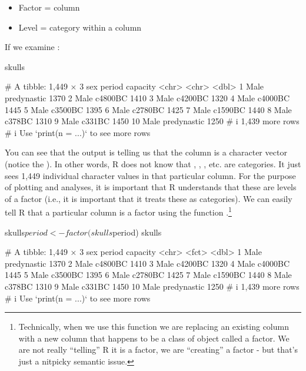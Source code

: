 {
\begin{itemize}
  \setlength\itemsep{-1em}
    \item Factor = column
    \item Level = category within a column
\end{itemize}
}

If we examine :

\begin{inR}
skulls
\end{inR}
\begin{outR}
# A tibble: 1,449 × 3
   sex   period      capacity
   <chr> <chr>          <dbl>
 1 Male  predynastic     1370
 2 Male  c4800BC         1410
 3 Male  c4200BC         1320
 4 Male  c4000BC         1445
 5 Male  c3500BC         1395
 6 Male  c2780BC         1425
 7 Male  c1590BC         1440
 8 Male  c378BC          1310
 9 Male  c331BC          1450
10 Male  predynastic     1250
# i 1,439 more rows
# i Use `print(n = ...)` to see more rows
\end{outR}

\noindent
You can see that the output is telling us that the  column is a character vector (notice the ). In other words, R does not know that , , , etc. are categories. It just sees 1,449 individual character values in that particular column. For the purpose of plotting and analyses, it is important that R understands that these are levels of a factor (i.e., it is important that it treats these as categories). We can easily tell R that a particular column is a factor using the function .\footnote{Technically, when we use this function we are replacing an existing column with a new column that happens to be a class of object called a factor. We are not really ``telling'' R it is a factor, we are ``creating'' a factor - but that's just a nitpicky semantic issue.}

\begin{inR}
skulls$period <- factor(skulls$period)
skulls
\end{inR}
\begin{outR}
# A tibble: 1,449 × 3
   sex   period      capacity
   <chr> <fct>          <dbl>
 1 Male  predynastic     1370
 2 Male  c4800BC         1410
 3 Male  c4200BC         1320
 4 Male  c4000BC         1445
 5 Male  c3500BC         1395
 6 Male  c2780BC         1425
 7 Male  c1590BC         1440
 8 Male  c378BC          1310
 9 Male  c331BC          1450
10 Male  predynastic     1250
# i 1,439 more rows
# i Use `print(n = ...)` to see more rows
\end{outR}


